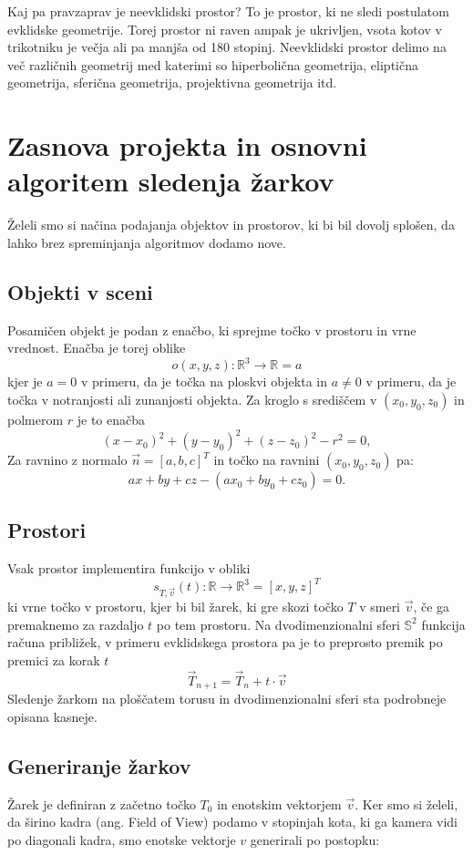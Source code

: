 \documentclass[titlepage]{article}
\begin{document}
Kaj pa pravzaprav je neevklidski prostor? To je prostor, ki ne sledi postulatom evklidske geometrije. 
Torej prostor ni raven ampak je ukrivljen, vsota kotov v trikotniku je večja ali pa manjša od 
180 stopinj. Neevklidski prostor delimo na več različnih geometrij med katerimi so 
hiperbolična geometrija, eliptična geometrija, sferična geometrija, projektivna geometrija itd.

\section{Zasnova projekta in osnovni algoritem sledenja žarkov}
Želeli smo si načina podajanja objektov in prostorov, ki bi bil dovolj splošen, da lahko brez
spreminjanja algoritmov dodamo nove.

\subsection{Objekti v sceni}
Posamičen objekt je podan z enačbo, ki sprejme točko v prostoru in vrne vrednost. 
Enačba je torej oblike
\[ o(x,y,z): \mathbb{R}^3 \to \mathbb{R} = a \]
kjer je \(a = 0\) v primeru, da je točka na ploskvi objekta in \( a \neq 0 \) v primeru, da 
je točka v notranjosti ali zunanjosti objekta.
Za kroglo s središčem v $(x_{0}, y_{0}, z_{0})$ in polmerom $r$ je to enačba
\[(x-x_{0})^{2}+(y-y_{0})^{2}+(z-z_{0})^{2}-r^{2}=0, \]
Za ravnino z normalo \( \vec{n} = [a, b, c]^T \) in točko na ravnini $(x_{0}, y_{0}, z_{0})$ pa:
\[ ax+by+cz-(ax_0+by_0+cz_0) = 0. \]

\subsection{Prostori}
Vsak prostor implementira funkcijo v obliki
\[ s_{T, \vec{v}}(t): \mathbb{R} \to \mathbb{R}^3 = [x, y, z]^T \]
ki vrne točko v prostoru, kjer bi bil žarek, ki gre skozi točko \(T\) v smeri \(\vec{v}\), če 
ga premaknemo za razdaljo \(t\) po tem prostoru. Na dvodimenzionalni sferi $\mathbb{S}^{2}$ funkcija računa približek, v primeru evklidskega prostora pa je to preprosto premik po premici za korak \(t\)
\[ \vec{T}_{n+1} = \vec{T}_{n} + t \cdot \vec{v} \]
\bigskip
\newline
Sledenje žarkom na ploščatem torusu in dvodimenzionalni sferi sta podrobneje opisana kasneje.

\subsection{Generiranje žarkov}
Žarek je definiran z začetno točko \(T_{0}\) in enotskim vektorjem \(\vec{v}\). Ker smo si želeli, da 
širino kadra (ang. Field of View) podamo v stopinjah kota, ki ga kamera vidi po diagonali kadra,
smo enotske vektorje \( v \) generirali po postopku:
\end{document}
